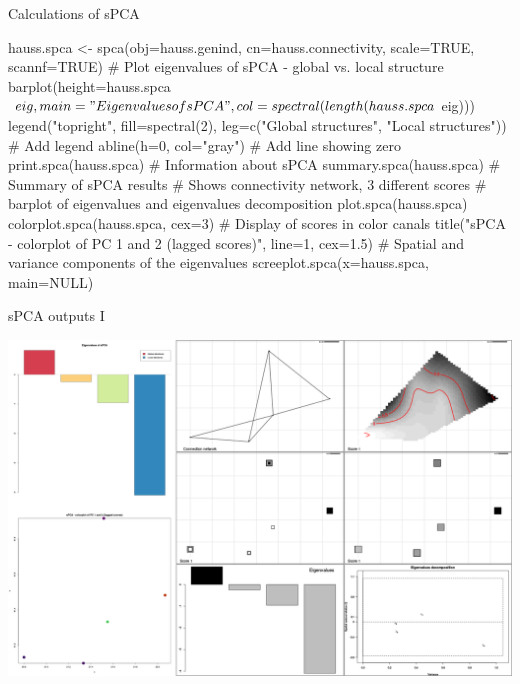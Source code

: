 \documentclass[compress, ucs, xelatex, 11pt, xcolor=svgnames,
	hyperref={
		bookmarks=true,
		unicode=true,
		colorlinks=true,
		pdftitle={Molecular data in R},
		plainpages=false,
		pdfauthor={Vojtech Zeisek},
		pdfsubject={Course about phylogeny and evolution in R},
		pdfcreator={XeLaTeX},
		pdfkeywords={R, evolution, phylogeny, molecular data},
		linkcolor=Tomato,
		anchorcolor=SaddleBrown,
		citecolor=Goldenrod,
		filecolor=DarkMagenta,
		menucolor=Sienna,
		urlcolor=DarkTurquoise,
		pdftex},
	url={hyphens, lowtilde} %
	]{beamer}
\begin{document}
\begin{frame}[fragile]{Calculations of sPCA}
	\begin{spluscode}
    hauss.spca <- spca(obj=hauss.genind, cn=hauss.connectivity,
      scale=TRUE, scannf=TRUE)
    # Plot eigenvalues of sPCA - global vs. local structure
    barplot(height=hauss.spca$eig, main="Eigenvalues of sPCA",
      col=spectral(length(hauss.spca$eig)))
    legend("topright", fill=spectral(2), leg=c("Global structures",
      "Local structures")) # Add legend
    abline(h=0, col="gray") # Add line showing zero
    print.spca(hauss.spca) # Information about sPCA
    summary.spca(hauss.spca) # Summary of sPCA results
    # Shows connectivity network, 3 different scores
    # barplot of eigenvalues and eigenvalues decomposition
    plot.spca(hauss.spca)
    colorplot.spca(hauss.spca, cex=3) # Display of scores in color canals
    title("sPCA - colorplot of PC 1 and 2 (lagged scores)", line=1, cex=1.5)
    # Spatial and variance components of the eigenvalues
    screeplot.spca(x=hauss.spca, main=NULL)
	\end{spluscode}
\end{frame}

\begin{frame}{sPCA outputs I}
	\begin{center}
		\includegraphics[width=\textwidth-1.5cm]{spca.png}
	\end{center}
\end{frame}
\end{document}
